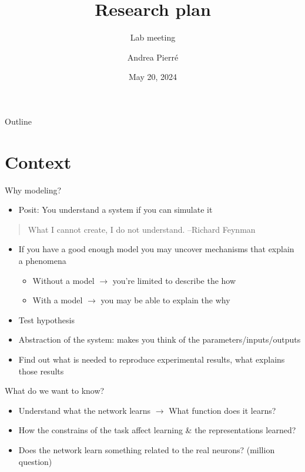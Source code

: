 \documentclass[bigger]{beamer}
\author{Andrea Pierré}
\date{May 20, 2024}
\title{Research plan}
\subtitle{Lab meeting}
\institute{Brown University}
\begin{document}
\maketitle
\begin{frame}[plain]{Outline}
\tableofcontents
\end{frame}

\section{Context }
\label{sec:orgd5c51ff}

\begin{frame}[<+->][label={sec:org61b5b9c}]{Why modeling?}
\begin{itemize}
\item Posit: You understand a system if you can simulate it
\end{itemize}
\begin{quote}
What I cannot create, I do not understand. --Richard Feynman
\end{quote}
\begin{itemize}
\item If you have a good enough model you may uncover mechanisms that explain a phenomena
\begin{itemize}
\item Without a model \(\to\) you're limited to describe the \alert{how}
\item With a model \(\to\) you may be able to explain the \alert{why}
\end{itemize}
\item Test hypothesis
\item Abstraction of the system: makes you think of the parameters/inputs/outputs
\item Find out what is needed to reproduce experimental results, what explains those results
\end{itemize}
\end{frame}
\begin{frame}[<+->][label={sec:org2708416}]{What do we want to know?}
\begin{itemize}
\item Understand what the network learns
\(\to\) What \alert{function} does it learns?
\item How the constrains of the task affect learning \& the representations learned?
\item Does the network learn something related to the real neurons? (million  question)
\end{itemize}
\end{frame}
\end{document}
